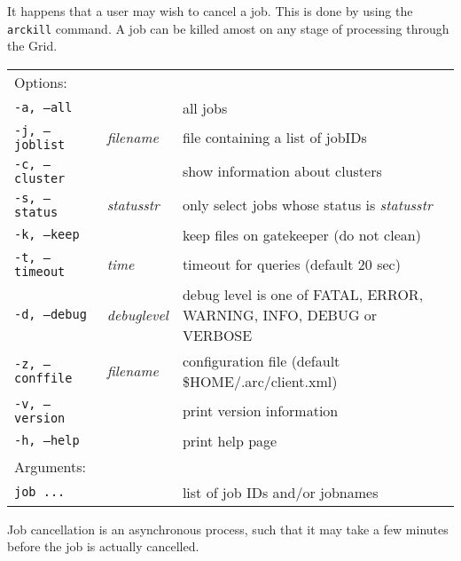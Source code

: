 It happens that a user may wish to cancel a job. This is done by using
the \texttt{arckill}  command. A
job can be killed amost on any stage of processing through the Grid.

\hspace*{0.5cm}
\begin{shaded}
\end{shaded}
\begin{longtable}{llp{8cm}}
   Options:&&\\
   \texttt{-a, --all}& & all jobs\\
   \texttt{-j, --joblist}& \textit{filename} & file containing a list of jobIDs\\
   \texttt{-c, --cluster}& & show information about clusters\\
   \texttt{-s, --status}& \textit{statusstr} &only select jobs whose status is \textit{statusstr}\\
   \texttt{-k, --keep}& & keep files on gatekeeper (do not clean)\\
   \texttt{-t, --timeout}& \textit{time} & timeout for queries (default 20 sec)\\
   \texttt{-d, --debug}& \textit{debuglevel}&debug level is one of  FATAL, ERROR, WARNING, INFO, DEBUG or VERBOSE\\
   \texttt{-z, --conffile}&\textit{filename}& configuration file (default {\$}HOME/.arc/client.xml)\\
   \texttt{-v, --version}& & print version information\\
   \texttt{-h, --help}& & print help page\\
   Arguments:&&\\
   \texttt{job ...} && list of job IDs and/or jobnames\\
\end{longtable}

\begin{framed}
   Job cancellation is an asynchronous process, such that it
   may take a few minutes before the job is actually cancelled.
\end{framed}

